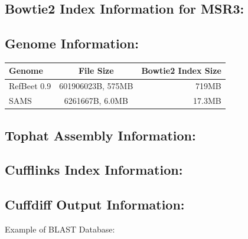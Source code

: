 \documentclass{article}
\begin{document}
\subsection{Bowtie2 Index Information for MSR3:}

\subsection{Genome Information:}

	\begin{tabular}{| l | c | r |}
	\hline
	Genome & File Size & Bowtie2 Index Size \\ \hline
	RefBeet 0.9 & 601906023B, 575MB & 719MB \\ \hline
	SAMS & 6261667B, 6.0MB & 17.3MB \\ \hline
	\end{tabular}

\subsection{Tophat Assembly Information:}

\subsection{Cufflinks Index Information:}

\subsection{Cuffdiff Output Information:}

Example of BLAST Database:

	
\end{document}
